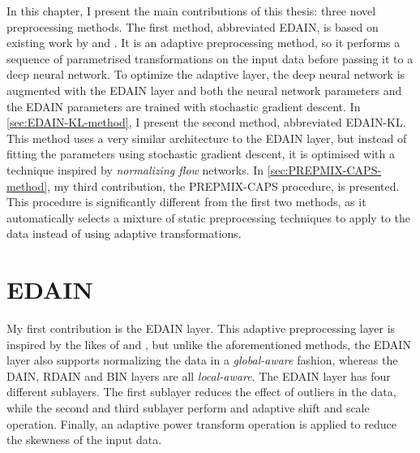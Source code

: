 \documentclass{statsmsc}
\begin{document}
{%
In this chapter, I present the main contributions of this thesis: three novel
preprocessing methods. The first method, abbreviated \acs{EDAIN}, is based on
existing work by \citeauthor{dain} and \citeauthor{bin}. It is an adaptive
preprocessing method, so it performs a sequence of parametrised transformations
on the input data before passing it to a deep neural network. To optimize the
adaptive layer, the deep neural network is augmented with the \acs{EDAIN} layer
and both the neural network parameters and the \acs{EDAIN} parameters are
trained with stochastic gradient descent.  In \cref{sec:EDAIN-KL-method}, I
present the second method, abbreviated \acs{EDAIN-KL}.  This method uses a very
similar architecture to the \acs{EDAIN} layer, but instead of fitting the
parameters using stochastic gradient descent, it is optimised with a technique
inspired by \textit{normalizing flow} networks. In
\cref{sec:PREPMIX-CAPS-method}, my third contribution, the \acs{PREPMIX-CAPS}
procedure, is presented. This procedure is significantly different from the
first two methods, as it automatically selects a mixture of static
preprocessing techniques to apply to the data instead of using adaptive
transformations.


\section{EDAIN}%
\label{sec:EDAIN-method}


My first contribution is the \acf{EDAIN} layer. This adaptive preprocessing layer is inspired
by the likes of \cite{dain}  and \cite{bin}, but unlike the aforementioned methods, the
\ac{EDAIN} layer also supports normalizing the data in a \textit{global-aware} fashion, whereas
the \ac{DAIN}, \ac{RDAIN} and \ac{BIN} layers are all \textit{local-aware}.
The \ac{EDAIN} layer has four different sublayers. The first sublayer reduces the effect of
outliers in the data, while the second and third sublayer perform and adaptive shift and
scale operation. Finally, an adaptive power transform operation is applied to reduce the
skewness of the input data.

}
\end{document}
